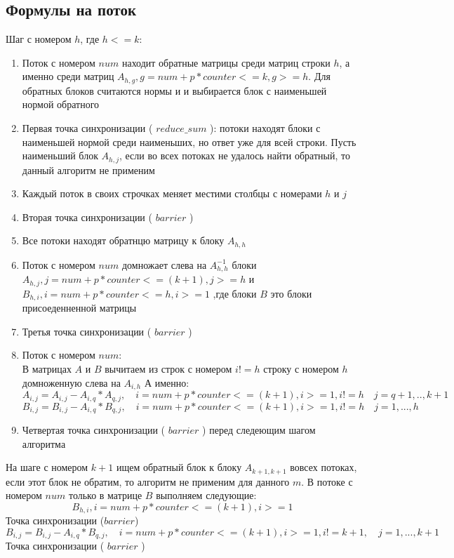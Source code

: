 \documentclass[a4paper,12pt]{article}
\begin{document}
\subsection{Формулы на поток}
Шаг с номером $h$, где $h <= k$:\\
\begin{enumerate}
\item Поток с номером $num$ находит обратные матрицы среди матриц строки $h$, а именно
среди матриц $A_{h,g}, g = num + p * counter <= k, g >= h$. Для обратных блоков считаются нормы и
и выбирается блок с наименьшей нормой обратного\\
\item Первая точка синхронизации ( $reduce\_sum$ ): потоки находят блоки с наименьшей нормой среди
наименьших, но ответ уже для всей строки. Пусть наименьший блок $A_{h, j}$, если во всех потоках 
не удалось найти обратный, то данный алгоритм не применим\\
\item Каждый поток в своих строчках меняет местими столбцы с номерами $h$ и $j$\\
\item Вторая точка синхронизации ( $barrier$ )\\
\item Все потоки находят обратнцю матрицу к блоку $A_{h, h}$\\
\item Поток с номером $num$ домножает слева на $A_{h, h}^{-1}$ блоки 
    $A_{h, j}, j = num + p * counter <= (k + 1)
        , j >= h$ и $B_{h, i}, i = num + p * counter <= h, i >= 1$
,где блоки $B$ это блоки присоеденненной матрицы\\
\item Третья точка синхронизации ( $barrier$ )\\
\item Поток с номером $num$:\\
В матрицах $A$ и $B$ вычитаем из строк с номером $i != h$ строку с номером $h$ 
        домноженную слева на $A_{i, h}$ 
        А именно: 
        $$A_{i, j} = A_{i, j} - A_{i, q} * A_{q, j}, \quad i = num + p * counter <= (k + 1), i>= 1,
        i != h
        \quad j = q + 1,..,k+1$$
        $$B_{i, j} = B_{i, j} - A_{i, q} * B_{q, j}, \quad i = num + p * counter <= (k + 1), i>= 1,
        i != h
        \quad j = 1,...,h$$
\item Четвертая точка синхронизации ( $barrier$ ) перед следеющим шагом алгоритма
\end{enumerate}
На шаге с номером $k + 1$ ищем обратный блок к блоку $A_{k+1,k+1}$ вовсех потоках,
если этот блок не обратим,
то алгоритм не применим для данного $m$. В потоке с номером  
$num$ только в матрице $B$ выполняем следующие:
$$B_{h, i}, i = num + p * counter <= (k + 1), i >= 1$$
Точка синхронизации ($barrier$)
$$B_{i,j} = B_{i,j} - A_{i,q} * B_{q,j}, \quad i = num + p * counter <= (k + 1)
, i >= 1, i != k + 1, \quad j = 1,...,k+1$$
Точка синхронизации ( $barrier$ )
\end{document}
